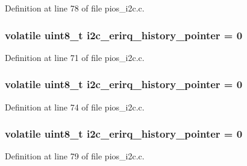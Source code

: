 \-Definition at line 78 of file pios\-\_\-i2c.\-c.

\hypertarget{group___p_i_o_s___i2_c_ga0593115613cf2d368fe6dbe7b4e5dcff}{
\subsubsection[{i2c\-\_\-erirq\-\_\-history\-\_\-pointer}]{\setlength{\rightskip}{0pt plus 5cm}volatile uint8\-\_\-t {\bf i2c\-\_\-erirq\-\_\-history\-\_\-pointer} = 0}}\label{group___p_i_o_s___i2_c_ga0593115613cf2d368fe6dbe7b4e5dcff}


\-Definition at line 71 of file pios\-\_\-i2c.\-c.

\hypertarget{group___p_i_o_s___i2_c_ga0593115613cf2d368fe6dbe7b4e5dcff}{
\subsubsection[{i2c\-\_\-erirq\-\_\-history\-\_\-pointer}]{\setlength{\rightskip}{0pt plus 5cm}volatile uint8\-\_\-t {\bf i2c\-\_\-erirq\-\_\-history\-\_\-pointer} = 0}}\label{group___p_i_o_s___i2_c_ga0593115613cf2d368fe6dbe7b4e5dcff}


\-Definition at line 74 of file pios\-\_\-i2c.\-c.

\hypertarget{group___p_i_o_s___i2_c_ga0593115613cf2d368fe6dbe7b4e5dcff}{
\subsubsection[{i2c\-\_\-erirq\-\_\-history\-\_\-pointer}]{\setlength{\rightskip}{0pt plus 5cm}volatile uint8\-\_\-t {\bf i2c\-\_\-erirq\-\_\-history\-\_\-pointer} = 0}}\label{group___p_i_o_s___i2_c_ga0593115613cf2d368fe6dbe7b4e5dcff}


\-Definition at line 79 of file pios\-\_\-i2c.\-c.

